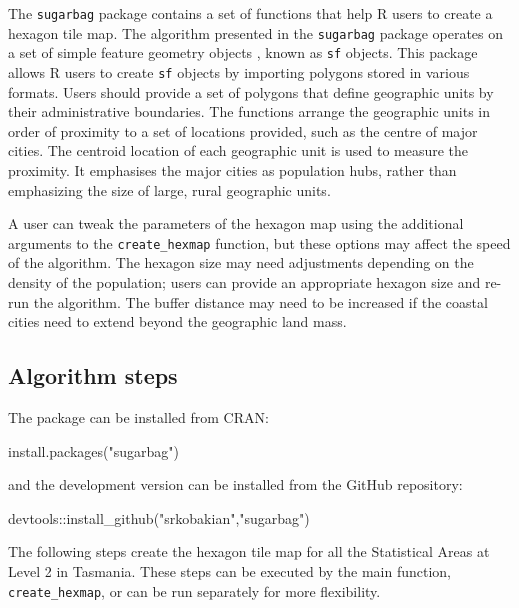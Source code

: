 The \texttt{sugarbag} package contains a set of functions that help R
users to create a hexagon tile map. The algorithm presented in the
\texttt{sugarbag} package operates on a set of simple feature geometry
objects , known as \texttt{sf} objects\citep{sf}. This package allows R
users to create \texttt{sf} objects by importing polygons stored in
various formats. Users should provide a set of polygons that define
geographic units by their administrative boundaries. The functions
arrange the geographic units in order of proximity to a set of locations
provided, such as the centre of major cities. The centroid location of
each geographic unit is used to measure the proximity. It emphasises the
major cities as population hubs, rather than emphasizing the size of
large, rural geographic units.

A user can tweak the parameters of the hexagon map using the additional
arguments to the \texttt{create\_hexmap} function, but these options may
affect the speed of the algorithm. The hexagon size may need adjustments
depending on the density of the population; users can provide an
appropriate hexagon size and re-run the algorithm. The buffer distance
may need to be increased if the coastal cities need to extend beyond the
geographic land mass.

\hypertarget{algorithm-steps}{%
\subsection{Algorithm steps}\label{algorithm-steps}}

The package can be installed from CRAN:

\begin{Schunk}
\begin{Sinput}
install.packages("sugarbag")
\end{Sinput}
\end{Schunk}

and the development version can be installed from the GitHub repository:

\begin{Schunk}
\begin{Sinput}
devtools::install_github("srkobakian","sugarbag")
\end{Sinput}
\end{Schunk}

The following steps create the hexagon tile map for all the Statistical
Areas at Level 2 in Tasmania. These steps can be executed by the main
function, \texttt{create\_hexmap}, or can be run separately for more
flexibility.

